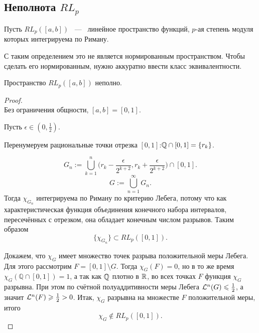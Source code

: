 \subsection{Неполнота $RL_p$}

\begin{definition}
	Пусть $RL_p([a, b])$ ~---~ линейное пространство функций, $p$-ая степень модуля которых интегрируема по Риману.
\end{definition}
\begin{remark}
	С таким определением это не является нормированным пространством. Чтобы сделать его нормированным, нужно аккуратно ввести класс эквивалентности.
\end{remark}
\begin{theorem}
	Пространство $RL_p([a, b])$ неполно.
\end{theorem}
\begin{proof} \ \\
	Без ограничения общности, $[a, b] = [0, 1]$.

	Пусть $\epsilon \in (0, \frac{1}{2})$.

	Перенумеруем рациональные точки отрезка $[0, 1]$:\quad $\mathbb{Q} \cap [0, 1] = \{r_k\}$.

	\[
	G_n := \bigcup_{k=1}^n \Big(r_k - \frac{\epsilon}{2^{k+2}}, r_k + \frac{\epsilon}{2^{k+2}}\Big) \cap  [0, 1].
	\]\[
	G := \bigcup_{n = 1}^\infty G_n.
	\]
	\begingroup
	\renewcommand{\theequation}{\arabic{equation}}
	Тогда $\chi_{G_n}$ интегрируема по Риману по критерию Лебега, потому что как характеристическая функция объединения конечного набора интервалов, пересечённых с отрезком, она обладает конечным числом разрывов. Таким образом
	\begin{equation}
		\{\chi_{G_n}\} \subset RL_p([0, 1]).
		\label{rlp:gn_rlp}
	\end{equation}

	Докажем, что $\chi_G$ имеет множество точек разрыва положительной меры Лебега. Для этого рассмотрим $F = [0, 1] \setminus G$. Тогда $\chi_G(F) = 0$, но в то же время $\chi_G(\mathbb{Q} \cap [0, 1]) = 1$, а так как $\mathbb{Q}$ плотно в $\mathbb{R}$, во всех точках $F$ функция $\chi_G$ разрывна. При этом по счётной полуаддитивности меры Лебега $\mathcal{L}^n(G) \leqslant \frac{1}{2}$, а значит $\mathcal{L}^n(F) \geqslant \frac{1}{2} > 0$. Итак, $\chi_G$ разрывна на множестве $F$ положительной меры, итого
	\begin{equation}
		\chi_G \not\in RL_p([0, 1]).
		\label{rlp:g_nrlp}
	\end{equation}


\end{proof}
